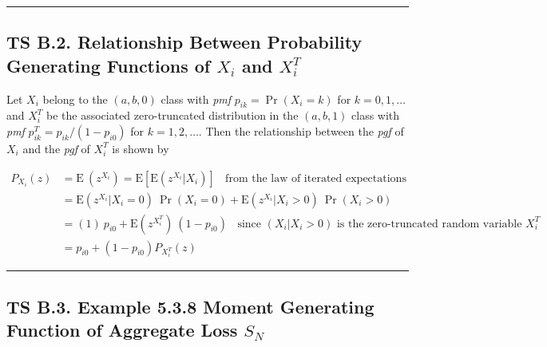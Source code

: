 \documentclass[]{book}
\theoremstyle{definition}
\theoremstyle{definition}
\theoremstyle{definition}
\theoremstyle{remark}
\begin{document}
\begin{center}\rule{0.5\linewidth}{\linethickness}\end{center}

\subsection*{\texorpdfstring{TS B.2. Relationship Between Probability
Generating Functions of \(X_i\) and
\(X_i^T\)}{TS B.2. Relationship Between Probability Generating Functions of X\_i and X\_i\^{}T}}\label{ts-b.2.-relationship-between-probability-generating-functions-of-x_i-and-x_it}

Let \(X_i\) belong to the \((a,b,0)\) class with \emph{pmf}
\(p_{ik} = \Pr(X_i = k)\) for \(k=0,1,\ldots\) and \(X_i^T\) be the
associated zero-truncated distribution in the \((a,b,1)\) class with
\emph{pmf} \(p_{ik}^T = p_{ik}/(1-p_{i0})\) for \(k=1,2,\ldots\). Then
the relationship between the \emph{pgf} of \(X_i\) and the \emph{pgf} of
\(X_i^T\) is shown by

\[\begin{aligned}
P_{X_i}(z) &= \mathrm{E~}(z^{X_i}) = \mathrm{E}\left[  \mathrm{E}\left( z^{X_i} | X_i \right) \right] ~~~~ \text{from the law of iterated expectations} \\ 
&= \mathrm{E}\left( z^{X_i} | X_i=0 \right)~ \Pr(X_i=0) + \mathrm{E}\left( z^{X_i} | X_i>0 \right) ~ \Pr(X_i>0) \\
&= (1)~ p_{i0} + \mathrm{E}(z^{X_i^T}) ~ (1-p_{i0}) ~~~~ \text{since } (X_i | X_i>0) \text{ is the zero-truncated random variable } X_i^T \\
&= p_{i0} +(1-p_{i0}) P_{X_i^{T}}(z)
\end{aligned}\]

\begin{center}\rule{0.5\linewidth}{\linethickness}\end{center}

\subsection*{\texorpdfstring{TS B.3. Example 5.3.8 Moment Generating
Function of Aggregate Loss
\(S_N\)}{TS B.3. Example 5.3.8 Moment Generating Function of Aggregate Loss S\_N}}\label{ts-b.3.-example-5.3.8-moment-generating-function-of-aggregate-loss-s_n}
\end{document}
